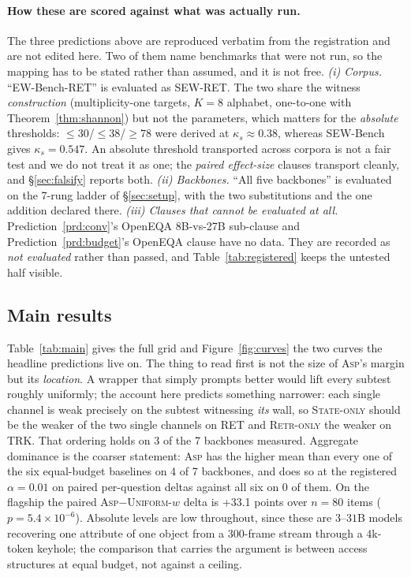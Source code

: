 \documentclass[10pt]{article}
\newcommand{\VnBackbones}{seven}
\newcommand{\VlocCount}{3}
\newcommand{\VnMeasured}{7}
\providecommand{\VpairedFlagDelta}{--}
\providecommand{\VpairedFlagP}{--}
\providecommand{\VpairedFlagN}{--}
\providecommand{\VdomCount}{--}
\providecommand{\VsigCount}{--}
\providecommand{\VnBackbones}{--}
\renewcommand{\VpairedFlagDelta}{+33.1}
\renewcommand{\VpairedFlagP}{5.4\times10^{-6}}
\renewcommand{\VpairedFlagN}{80}
\renewcommand{\VdomCount}{4}
\renewcommand{\VsigCount}{0}
\renewcommand{\VnBackbones}{7}
\theoremstyle{definition}
\theoremstyle{plain}
\newcommand{\ASP}{\textsc{Asp}}
\begin{document}
\paragraph{How these are scored against what was actually run.}\label{sec:predictions-map} The three predictions above are reproduced verbatim from the registration and are not edited here. Two of them name benchmarks that were not run, so the mapping has to be stated rather than assumed, and it is not free.
\emph{(i) Corpus.} ``EW-Bench-RET'' is evaluated as SEW-RET. The two share the witness \emph{construction} (multiplicity-one targets, $K{=}8$ alphabet, one-to-one with Theorem~\ref{thm:shannon}) but not the parameters, which matters for the \emph{absolute} thresholds: $\le30$/$\le38$/$\ge78$ were derived at $\kappa_s\approx0.38$, whereas SEW-Bench gives $\kappa_s{=}0.547$. An absolute threshold transported across corpora is not a fair test and we do not treat it as one; the \emph{paired effect-size} clauses transport cleanly, and \S\ref{sec:falsify} reports both.
\emph{(ii) Backbones.} ``All five backbones'' is evaluated on the \VnBackbones{}-rung ladder of \S\ref{sec:setup}, with the two substitutions and the one addition declared there.
\emph{(iii) Clauses that cannot be evaluated at all.} Prediction~\ref{prd:conv}'s OpenEQA 8B-vs-27B sub-clause and Prediction~\ref{prd:budget}'s OpenEQA clause have no data. They are recorded as \emph{not evaluated} rather than passed, and Table~\ref{tab:registered} keeps the untested half visible.

\subsection{Main results}

Table~\ref{tab:main} gives the full grid and Figure~\ref{fig:curves} the two curves the headline predictions live on. The thing to read first is not the size of \ASP{}'s margin but its \emph{location}. A wrapper that simply prompts better would lift every subtest roughly uniformly; the account here predicts something narrower: each single channel is weak precisely on the subtest witnessing \emph{its} wall, so \textsc{State-only} should be the weaker of the two single channels on RET and \textsc{Retr-only} the weaker on TRK. That ordering holds on \VlocCount{} of the \VnMeasured{} backbones measured. Aggregate dominance is the coarser statement: \ASP{} has the higher mean than every one of the six equal-budget baselines on \VdomCount{} of \VnBackbones{} backbones, and does so at the registered $\alpha{=}0.01$ on paired per-question deltas against all six on \VsigCount{} of them. On the flagship the paired \ASP{}$-$\textsc{Uniform-}$w$ delta is \VpairedFlagDelta{} points over $n{=}\VpairedFlagN{}$ items ($p=\VpairedFlagP{}$). Absolute levels are low throughout, since these are $3$--$31$B models recovering one attribute of one object from a $300$-frame stream through a $4$k-token keyhole; the comparison that carries the argument is between access structures at equal budget, not against a ceiling.
\end{document}
